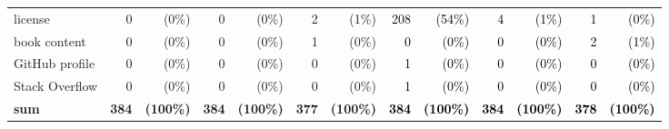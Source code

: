 \documentclass[smallextended]{svjour3}       %
\newcommand{\fix}[1]{\textcolor{black}{#1}}
\begin{document}
\begin{table}[t]
{\begin{tabular}{lr@{}rr@{}rr@{}r|r@{}rr@{}rr@{}r}
license                                & 0                             & (0\%)                             & 0                             & (0\%)                             & 2                             & (1\%)                             & \fix{ 208}                           & \fix{ (54\%)}                            & \fix{ 4}                             & \fix{ (1\%)}                             & \fix{ 1}                             & \fix{ (0\%)}                             \\
book content                           & 0                             & (0\%)                             & 0                             & (0\%)                             & 1                             & (0\%)                             & \fix{ 0}                             & \fix{ (0\%)}                             & \fix{ 0}                             & \fix{ (0\%)}                             & \fix{ 2}                             & \fix{ (1\%)}                             \\
GitHub profile                         & 0                             & (0\%)                             & 0                             & (0\%)                             & 0                             & (0\%)                             & \fix{ 1}                             & \fix{ (0\%)}                             & \fix{ 0}                             & \fix{ (0\%)}                             & \fix{ 0}                             & \fix{ (0\%)}                             \\
Stack Overflow                         & 0                             & (0\%)                             & 0                             & (0\%)                             & 0                             & (0\%)                             & \fix{ 1}                             & \fix{ (0\%)}                             & \fix{ 0}                             & \fix{ (0\%)}                             & \fix{ 0}                             & \fix{ (0\%)}                             \\
\midrule
\textbf{sum}          & \textbf{384} & \textbf{(100\%)} & \textbf{384} & \textbf{(100\%)} & \textbf{377} & \textbf{(100\%)} & \fix{ \textbf{384}} & \fix{ \textbf{(100\%)}} & \fix{ \textbf{384}} & \fix{ \textbf{(100\%)}} & \fix{ \textbf{378}} & \fix{ \textbf{(100\%)}} \\ 
\bottomrule
\end{tabular}}
\end{table}
\end{document}

